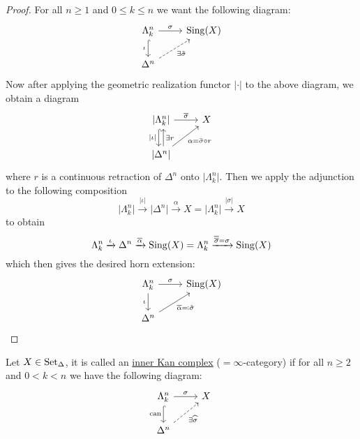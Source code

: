\begin{proof}
    For all $n \geq 1$ and $0 \leq k \leq n$ we want the following diagram:
    \[
    \begin{tikzcd}
        \Lambda_k^n 
        \arrow[d, hook, "\iota"']
        \arrow[r, "\sigma"]
        &
        \Sing(X)
        \\
        \Delta^n
        \arrow[ru, dashed ,"\exists \Tilde{\sigma}"']
    \end{tikzcd}
    \]
    Now after applying the geometric realization functor $\lvert \cdot\rvert$ to the above diagram, we obtain a diagram
    \[
    \begin{tikzcd}
        \lvert \Lambda_k^n \rvert
        \arrow[d, hook, shift right, "\lvert \iota \rvert"']
        \arrow[r, "\overline{\sigma}"]
        &
        X
        \\
        \lvert \Delta^n \rvert
        \arrow[ru, "\alpha= \Bar{\sigma} \circ r"']
        \arrow[u, shift right, "\exists r"']
    \end{tikzcd}
    \]
    where $r$ is a continuous retraction of $\Delta^n$ onto $\lvert \Lambda_k^n \rvert$.
    Then we apply the adjunction to the following composition
    \[
    \lvert \Lambda_k^n\rvert 
    \xrightarrow{\lvert \iota \rvert} 
    \lvert \Delta^n\rvert
    \xrightarrow{\alpha}
    X = \lvert \Lambda_k^n\rvert 
    \xrightarrow{\lvert \sigma \rvert}
    X
    \]
    to obtain 
    \[
    \Lambda_k^n
    \xrightarrow{\iota}
    \Delta^n
    \xrightarrow{\overline{\alpha}}
    \operatorname{Sing}(X) = \Lambda_k^n
    \xrightarrow{\overline{\overline{\sigma}}=\sigma}
    \operatorname{Sing}(X)
    \]
    which then gives the desired horn extension:
    \[
    \begin{tikzcd}
        \Lambda_k^n 
        \arrow[d, "\iota"']
        \arrow[r, "\sigma"]
        &
        \Sing(X)
        \\
        \Delta^n
        \arrow[ru, "\overline{\alpha}\eqqcolon \Tilde{\sigma}"']
    \end{tikzcd}
    \]
\end{proof}

\begin{defi}
    Let $X \in \operatorname{Set}_{\Delta}$, it is called an \underline{inner Kan complex} ($=\infty$-category) if for all $n\geq 2$ and $0 < k < n $ we have the following diagram:
    \[
    \begin{tikzcd}
        \Lambda_k^n
        \arrow[r, "\sigma"]
        \arrow[d, hook, "\can"']
        &
        X
        \\
        \Delta^n
        \arrow[ur, dashed, "\exists \widehat{\sigma}"']
    \end{tikzcd}
    \]
\end{defi}

